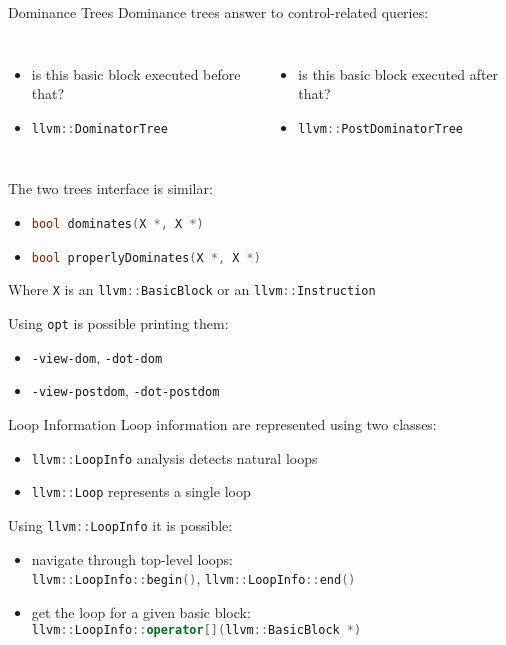 \documentclass[10pt,mathserif]{beamer}
\newcommand{\cppinline}[1]{\lstinline[language=C++]!#1!}
\begin{document}
\begin{frame}{Dominance Trees}
Dominance trees answer to control-related queries:

\begin{columns}[t]
\begin{itemize}
\item is this basic block executed before that?
\item \cppinline{llvm::DominatorTree}
\end{itemize}

\begin{itemize}
\item is this basic block executed after that?
\item \cppinline{llvm::PostDominatorTree}
\end{itemize}
\end{columns}

\bigskip
The two trees interface is similar:

\begin{itemize}
\item \cppinline{bool dominates(X *, X *)}
\item \cppinline{bool properlyDominates(X *, X *)}
\end{itemize}

Where \cppinline{X} is an \cppinline{llvm::BasicBlock} or an
\cppinline{llvm::Instruction}

\bigskip
Using \texttt{opt} is possible printing them:

\begin{itemize}
\item \texttt{-view-dom}, \texttt{-dot-dom}
\item \texttt{-view-postdom}, \texttt{-dot-postdom}
\end{itemize}
\end{frame}

\begin{frame}{Loop Information}
Loop information are represented using two classes:

\begin{itemize}
\item \cppinline{llvm::LoopInfo} analysis detects natural loops
\item \cppinline{llvm::Loop} represents a single loop
\end{itemize}

Using \cppinline{llvm::LoopInfo} it is possible:

\begin{itemize}
\item navigate through top-level loops: \\
      \cppinline{llvm::LoopInfo::begin()}, \cppinline{llvm::LoopInfo::end()}
\item get the loop for a given basic block: \\
      \cppinline{llvm::LoopInfo::operator[](llvm::BasicBlock *)}
\end{itemize}
\end{frame}
\end{document}
